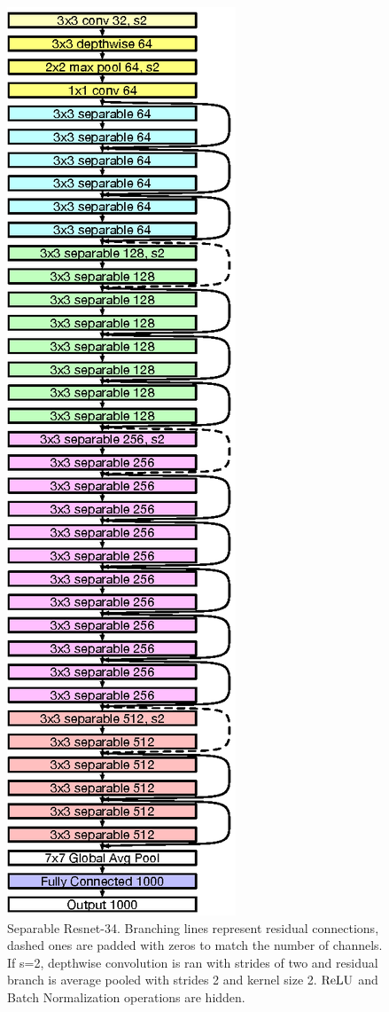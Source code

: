 \begin{figure}
\vspace{-65px}
  \begin{center}
        \includegraphics{images/separable_resnet.eps}
  \end{center}
  \caption{Separable Resnet-34. Branching lines represent residual connections, dashed ones are padded with zeros to match the number of channels. If s=2, depthwise convolution is ran with strides of two and residual branch is average pooled with strides 2 and kernel size 2. $\textrm{ReLU}$ and Batch Normalization operations are hidden.}
  \label{fig:model}
\end{figure}

